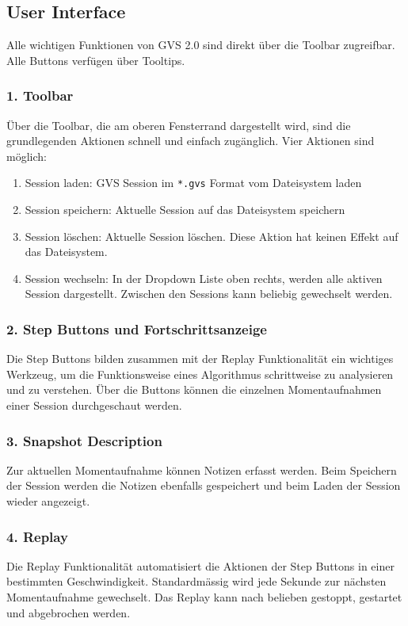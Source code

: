 \documentclass[11pt,a4paper,english,oneside]{book}
\numberwithin{equation}{chapter}
\begin{document}
	\subsection{User Interface}
	Alle wichtigen Funktionen von GVS 2.0 sind direkt über die Toolbar zugreifbar. Alle Buttons verfügen über Tooltips. 
	
	\subsubsection{1. Toolbar}
	Über die Toolbar, die am oberen Fensterrand dargestellt wird, sind die grundlegenden Aktionen schnell und einfach zugänglich. Vier Aktionen sind möglich: 
	\begin{enumerate}
		\item Session laden: GVS Session im \lstinline|*.gvs| Format vom Dateisystem laden
		\item Session speichern: Aktuelle Session auf das Dateisystem speichern
		\item Session löschen: Aktuelle Session löschen. Diese Aktion hat keinen Effekt auf das Dateisystem.
		\item Session wechseln: In der Dropdown Liste oben rechts, werden alle aktiven Session dargestellt. Zwischen den Sessions kann beliebig gewechselt werden. 
	\end{enumerate}
	
	\subsubsection{2. Step Buttons und Fortschrittsanzeige}
	Die Step Buttons bilden zusammen mit der Replay Funktionalität ein wichtiges Werkzeug, um die Funktionsweise eines Algorithmus schrittweise zu analysieren und zu verstehen. Über die Buttons können die einzelnen Momentaufnahmen einer Session durchgeschaut werden.
	
	\subsubsection{3. Snapshot Description}
	Zur aktuellen Momentaufnahme können Notizen erfasst werden. Beim Speichern der Session werden die Notizen ebenfalls gespeichert und beim Laden der Session wieder angezeigt.
	
	\subsubsection{4. Replay}
	Die Replay Funktionalität automatisiert die Aktionen der Step Buttons in einer bestimmten Geschwindigkeit. Standardmässig wird jede Sekunde zur nächsten Momentaufnahme gewechselt. Das Replay kann nach belieben gestoppt, gestartet und abgebrochen werden.
	
\end{document}
